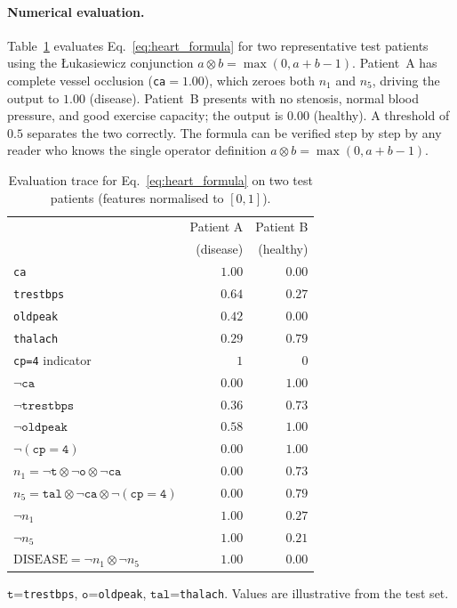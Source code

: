 \documentclass[lettersize,journal]{IEEEtran}
\newcommand{\tnorm}{\otimes}      %
\begin{document}
\paragraph{Numerical evaluation.}
Table~\ref{tab:heart_trace} evaluates Eq.~\eqref{eq:heart_formula} for two
representative test patients using the \L{}ukasiewicz conjunction
$a \tnorm b = \max(0, a + b - 1)$.
Patient~A has complete vessel occlusion (\texttt{ca}$=1.00$), which zeroes
both $n_1$ and $n_5$, driving the output to $1.00$ (disease).
Patient~B presents with no stenosis, normal blood pressure, and good
exercise capacity; the output is $0.00$ (healthy).
A threshold of $0.5$ separates the two correctly.
The formula can be verified step by step by any reader who knows the single
operator definition $a \tnorm b = \max(0, a + b - 1)$.

\begin{table}[h]
\centering
\caption{Evaluation trace for Eq.~\eqref{eq:heart_formula} on two test
patients (features normalised to $[0,1]$).}
\label{tab:heart_trace}
\setlength{\tabcolsep}{5pt}
\begin{tabular}{lrr}
\toprule
 & Patient A & Patient B \\
  & (disease) & (healthy) \\
\midrule
\texttt{ca} & $1.00$ & $0.00$ \\
\texttt{trestbps} & $0.64$ & $0.27$ \\
\texttt{oldpeak} & $0.42$ & $0.00$ \\
\texttt{thalach} & $0.29$ & $0.79$ \\
\texttt{cp=4} indicator & $1$ & $0$ \\
\midrule
$\neg\mathtt{ca}$ & $0.00$ & $1.00$ \\
$\neg\mathtt{trestbps}$ & $0.36$ & $0.73$ \\
$\neg\mathtt{oldpeak}$ & $0.58$ & $1.00$ \\
$\neg(\mathtt{cp{=}4})$ & $0.00$ & $1.00$ \\
\midrule
$n_1 = \neg\mathtt{t} \tnorm \neg\mathtt{o} \tnorm \neg\mathtt{ca}$
  & $0.00$
  & $0.73$ \\
$n_5 = \mathtt{tal} \tnorm \neg\mathtt{ca} \tnorm \neg(\mathtt{cp{=}4})$
  & $ 0.00$
  & $ 0.79$ \\
\midrule
$\neg n_1$ & $1.00$ & $0.27$ \\
$\neg n_5$ & $1.00$ & $0.21$ \\
$\mathrm{DISEASE} = \neg n_1 \tnorm \neg n_5$
  & $\mathbf{1.00}$
  & $\mathbf{0.00}$ \\
\bottomrule
\end{tabular}
\end{table}
{\footnotesize $\mathtt{t}$=\texttt{trestbps}, $\mathtt{o}$=\texttt{oldpeak},
$\mathtt{tal}$=\texttt{thalach}. Values are illustrative from the test set.}
\end{document}
